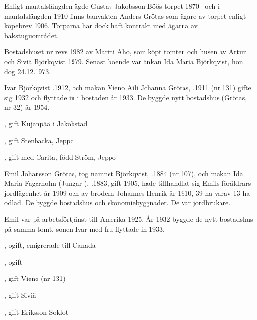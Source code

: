 Enligt  mantalslängden ägde Gustav Jakobsson Böös torpet 1870-- och i mantalslängden 1910 finns banvakten Anders Grötas som ägare av torpet enligt köpebrev 1906. Torparna har dock haft kontrakt med ägarna av bakstuguområdet.






Bostadshuset nr  revs 1982 av Martti Aho, som köpt tomten och husen av Artur och Siviä Björkqvist 1979. Senast boende var änkan Ida Maria Björkqvist, hon dog 24.12.1973.\jhvspace{}


Ivar Björkqvist .1912, och makan Vieno Aili Johanna Grötas, .1911 (nr 131) gifte sig 1932 och flyttade in i bostaden år 1933. De byggde nytt bostadshus (Grötas, nr 32) år 1954.
\begin{jhchildren}
  \item {}, gift Kujanpää i Jakobstad
  \item {}, gift Stenbacka, Jeppo
  \item {}, gift med Carita, född Ström, Jeppo
\end{jhchildren}


Emil Johansson Grötas, tog namnet Björkqvist, .1884 (nr 107), och makan Ida Maria Fagerholm (Jungar    ), .1883, gift 1905, hade tillhandlat sig Emils föräldrars jordlägenhet år 1909 och av brodern Johannes Henrik år 1910, 39 ha varav 13 ha odlad. De byggde bostadshus och ekonomiebyggnader. De var jordbrukare.

Emil var på arbetsförtjänst till Amerika 1925. År 1932 byggde de nytt bostadshus på samma tomt, sonen Ivar med fru flyttade in 1933.
\begin{jhchildren}
  \item {}, ogift, emigrerade till Canada
  \item {}, ogift
  \item {}, gift Vieno (nr 131)
  \item {}, gift Siviä
  \item {}, gift Eriksson Soklot
\end{jhchildren}


